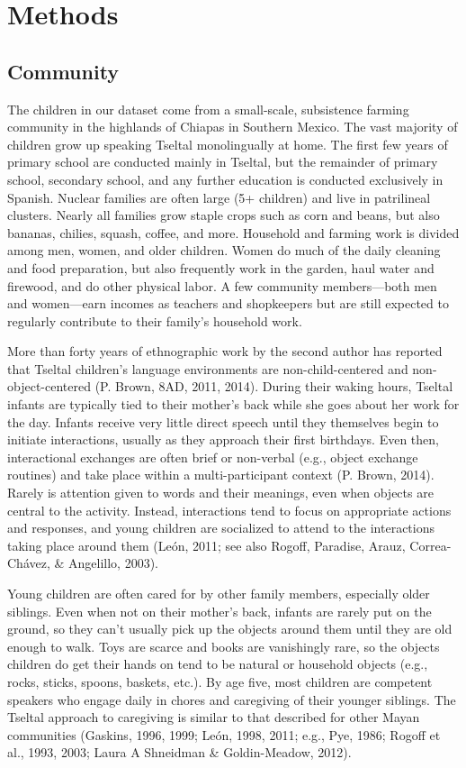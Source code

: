 \documentclass[floatsintext,man]{apa6}
\theoremstyle{definition}
\theoremstyle{definition}
\theoremstyle{definition}
\theoremstyle{remark}
\begin{document}
\hypertarget{methods}{\section{Methods}\label{methods}}

\subsection{Community}\label{methods-community}

The children in our dataset come from a small-scale, subsistence farming
community in the highlands of Chiapas in Southern Mexico. The vast
majority of children grow up speaking Tseltal monolingually at home. The
first few years of primary school are conducted mainly in Tseltal, but
the remainder of primary school, secondary school, and any further
education is conducted exclusively in Spanish. Nuclear families are
often large (5+ children) and live in patrilineal clusters. Nearly all
families grow staple crops such as corn and beans, but also bananas,
chilies, squash, coffee, and more. Household and farming work is divided
among men, women, and older children. Women do much of the daily
cleaning and food preparation, but also frequently work in the garden,
haul water and firewood, and do other physical labor. A few community
members---both men and women---earn incomes as teachers and shopkeepers
but are still expected to regularly contribute to their family's
household work.

More than forty years of ethnographic work by the second author has
reported that Tseltal children's language environments are
non-child-centered and non-object-centered (P. Brown, 8AD, 2011, 2014).
During their waking hours, Tseltal infants are typically tied to their
mother's back while she goes about her work for the day. Infants receive
very little direct speech until they themselves begin to initiate
interactions, usually as they approach their first birthdays. Even then,
interactional exchanges are often brief or non-verbal (e.g., object
exchange routines) and take place within a multi-participant context (P.
Brown, 2014). Rarely is attention given to words and their meanings,
even when objects are central to the activity. Instead, interactions
tend to focus on appropriate actions and responses, and young children
are socialized to attend to the interactions taking place around them
(León, 2011; see also Rogoff, Paradise, Arauz, Correa-Chávez, \&
Angelillo, 2003).

Young children are often cared for by other family members, especially
older siblings. Even when not on their mother's back, infants are rarely
put on the ground, so they can't usually pick up the objects around them
until they are old enough to walk. Toys are scarce and books are
vanishingly rare, so the objects children do get their hands on tend to
be natural or household objects (e.g., rocks, sticks, spoons, baskets,
etc.). By age five, most children are competent speakers who engage
daily in chores and caregiving of their younger siblings. The Tseltal
approach to caregiving is similar to that described for other Mayan
communities (Gaskins, 1996, 1999; León, 1998, 2011; e.g., Pye, 1986;
Rogoff et al., 1993, 2003; Laura A Shneidman \& Goldin-Meadow, 2012).
\end{document}
